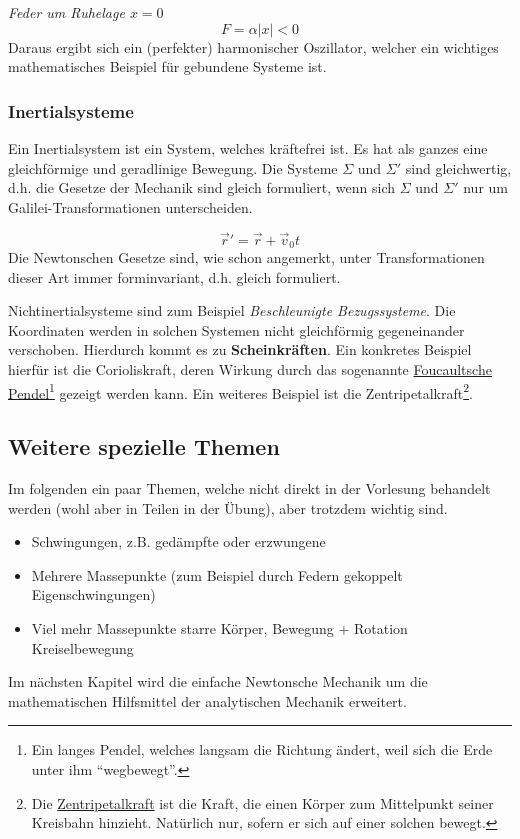 \begin{beispiel*}
\textit{Feder um Ruhelage $x = 0$}
$$F = \alpha |x| < 0$$
Daraus ergibt sich ein (perfekter) harmonischer Oszillator, welcher ein wichtiges mathematisches Beispiel für gebundene Systeme ist.
\end{beispiel*}


\subsubsection{Inertialsysteme}
\begin{definition*}[Inertialsystem]
	Ein Inertialsystem ist ein System, welches kräftefrei ist. Es hat als ganzes eine gleichförmige und geradlinige Bewegung.
Die Systeme $\Sigma$ und $\Sigma'$ sind gleichwertig, d.h. die Gesetze der Mechanik sind gleich formuliert, wenn sich $\Sigma$ und $\Sigma'$ nur um Galilei-Transformationen unterscheiden.
\end{definition*}

\begin{definition*}
$$ \vec{r}' = \vec{r} + \vec{v}_0t$$
Die Newtonschen Gesetze sind, wie schon angemerkt, unter Transformationen dieser Art immer forminvariant, d.h. gleich formuliert.
\end{definition*}

\begin{definition*}[Nichtinertialsysteme]
	Nichtinertialsysteme sind zum Beispiel \textit{Beschleunigte Bezugssysteme}. Die Koordinaten werden in solchen Systemen nicht gleichförmig gegeneinander verschoben. Hierdurch kommt es zu \textbf{Scheinkräften}. Ein konkretes Beispiel hierfür ist die Corioliskraft, deren Wirkung durch das sogenannte \href{https://de.wikipedia.org/wiki/Foucaultsches_Pendel}{Foucaultsche Pendel}\footnote{Ein langes Pendel, welches langsam die Richtung ändert, weil sich die Erde unter ihm "`wegbewegt"'.} gezeigt werden kann. Ein weiteres Beispiel ist die Zentripetalkraft\footnote{Die \href{http://de.wikipedia.org/wiki/Zentripetalkraft}{Zentripetalkraft} ist die Kraft, die einen Körper zum Mittelpunkt seiner Kreisbahn hinzieht. Natürlich nur, sofern er sich auf einer solchen bewegt.}.
\end{definition*}


\subsection{Weitere spezielle Themen}
Im folgenden ein paar Themen, welche nicht direkt in der Vorlesung behandelt werden (wohl aber in Teilen in der Übung), aber trotzdem wichtig sind.
\begin{itemize}
	\item Schwingungen, z.B. gedämpfte oder erzwungene
	\item Mehrere Massepunkte (zum Beispiel durch Federn gekoppelt \conseq Eigenschwingungen) 
	\item Viel mehr Massepunkte \conseq starre Körper, Bewegung $+$ Rotation \conseq Kreiselbewegung
\end{itemize}
Im nächsten Kapitel wird die einfache Newtonsche Mechanik um die mathematischen Hilfsmittel der analytischen Mechanik erweitert.

